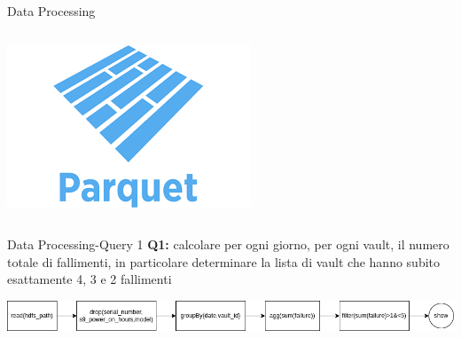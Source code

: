 \documentclass[13pt,aspectratio=169,t,xcolor=table]{beamer}
\begin{document}
\begin{frame}{Data Processing}
\begin{columns}
\begin{minipage}{0.5\textwidth}
\begin{adjustbox}{margin=0cm 0cm 0.8cm 0cm, center}
                \includegraphics[width=1\textwidth]{res/parquet.png}
            \end{adjustbox}
        \end{minipage}
    \end{columns}
\end{frame}

\begin{frame}{Data Processing-Query 1}
    \textbf{Q1:} calcolare per ogni giorno, per ogni vault, il numero totale di fallimenti, in particolare determinare la lista di vault che hanno subito esattamente 4, 3 e 2 fallimenti
    \begin{adjustbox}{margin=0cm 0cm 0cm 2cm, center}
        \includegraphics[width=1\textwidth]{res/query1_dag.png}
    \end{adjustbox}
\end{frame}
\end{document}
